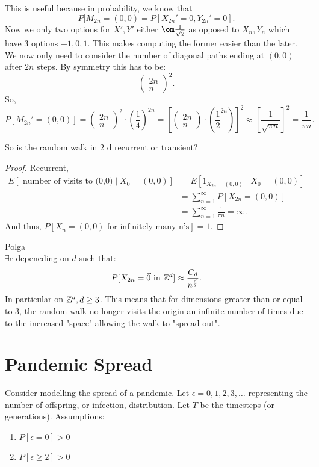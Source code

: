 \documentclass[a4paper]{article}
\begin{document}
This is useful because in probability, we know that
\[
  P[M_{2n} = (0,0) = P[X_{2n}' = 0, Y_{2n}' = 0] 
.\] 
Now we only two options for $X', Y'$ either  $\om \frac{1}{\sqrt{2} }$ as opposed to $X_n,Y_n$ which have 3 options  $-1,0,1$. This makes computing the former easier than the later. We now only need to consider the number of diagonal paths ending at  $(0,0)$ after  $2n$ steps. By symmetry this has to be:
 \[
\begin{pmatrix} 2n\\ n\end{pmatrix}^{2}
.\] 
So,
\[
  P[M_{2n}' = (0,0)] = \begin{pmatrix} 2n\\ n\end{pmatrix}^{2} \cdot (\frac{1}{4})^{2n} = [\begin{pmatrix} 2n\\ n\end{pmatrix} \cdot (\frac{1}{2}^{2n})]^{2} \approx [\frac{1}{\sqrt{\pi n} }]^{2} = \frac{1}{\pi n}
.\] 

\begin{note}
  So is the random walk in $2$ d recurrent or transient? 
\end{note}
\begin{proof}
  Recurrent,
  \begin{align*}
  E[\text{ number of visits to (0,0)} \mid  X_0 = (0,0)] &= E[1_{X_{2n} = (0,0)} \mid X_0 = (0,0)] \\
                                                         &= \sum_{n=1}^{\infty} P[X_{2n} = (0,0)] \\
                                                         &= \sum_{n=1}^{\infty} \frac{1}{\pi n} = \infty
.\end{align*}
And thus, $P[X_n = (0,0) \text{ for infinitely many n's}] = 1$.  
\end{proof}


\begin{theorem}{Polga}\\
  $\exists c$ depeneding on $d$ such that:
   \[
     P[X_{2n} = \vec{0} \text{ in } \mathbb{Z}^{d}] \approx \frac{C_d}{n^{\frac{d}{2}}} 
  .\] 
  In particular on $\mathbb{Z}^{d}, d \geq 3$. This means that for dimensions greater than or equal to 3, the random walk no longer visits the origin an infinite number of times due to the increased "space" allowing the walk to "spread out".
\end{theorem}

\section{Pandemic Spread}
Consider modelling the spread of a pandemic.  Let $\epsilon = 0,1,2,3,\ldots$ representing the number of offspring, or infection, distribution. Let $T$ be the timesteps (or generations). 
Assumptions:
\begin{enumerate}
  \item $P[\epsilon =0] > 0$ 
  \item $P[\epsilon  \geq 2] > 0$
\end{enumerate}
\end{document}
